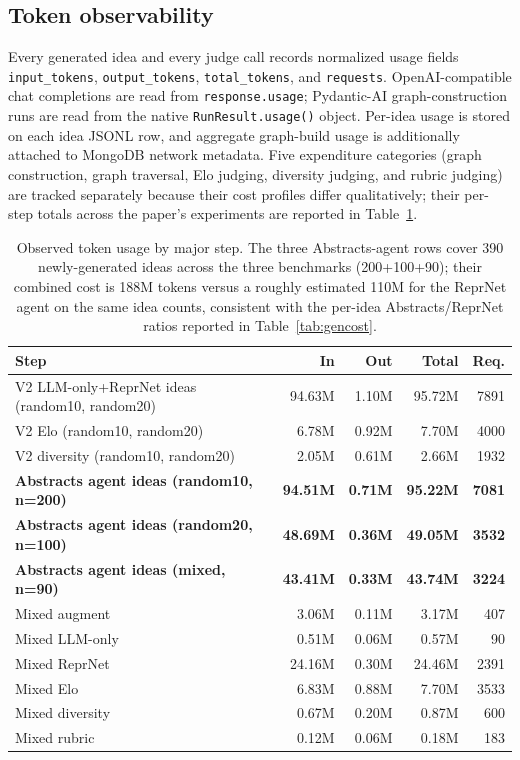 \documentclass[10pt,twocolumn]{article}
\begin{document}
\subsection{Token observability}

Every generated idea and every judge call records normalized usage
fields \texttt{input\_tokens}, \texttt{output\_tokens},
\texttt{total\_tokens}, and \texttt{requests}.  OpenAI-compatible chat
completions are read from \texttt{response.usage}; Pydantic-AI
graph-construction runs are read from the native
\texttt{RunResult.usage()} object.  Per-idea usage is stored on each
idea JSONL row, and aggregate graph-build usage is additionally
attached to MongoDB network metadata.  Five expenditure categories
(graph construction, graph traversal, Elo judging, diversity judging,
and rubric judging) are tracked separately because their cost profiles
differ qualitatively; their per-step totals across the paper's
experiments are reported in Table~\ref{tab:stepcost}.

\begin{table}[t]
\centering
\scriptsize
\setlength{\tabcolsep}{4pt}
\begin{tabular}{lrrrr}
\toprule
Step & In & Out & Total & Req. \\
\midrule
V2 LLM-only+ReprNet ideas (random10, random20) & 94.63M & 1.10M & 95.72M & 7891 \\
V2 Elo (random10, random20)               &  6.78M & 0.92M &  7.70M & 4000 \\
V2 diversity (random10, random20)         &  2.05M & 0.61M &  2.66M & 1932 \\
\textbf{Abstracts agent ideas (random10, n=200)} & \textbf{94.51M} & \textbf{0.71M} & \textbf{95.22M} & \textbf{7081} \\
\textbf{Abstracts agent ideas (random20, n=100)} & \textbf{48.69M} & \textbf{0.36M} & \textbf{49.05M} & \textbf{3532} \\
\textbf{Abstracts agent ideas (mixed, n=90)}     & \textbf{43.41M} & \textbf{0.33M} & \textbf{43.74M} & \textbf{3224} \\
Mixed augment          &  3.06M & 0.11M &  3.17M &  407 \\
Mixed LLM-only         &  0.51M & 0.06M &  0.57M &   90 \\
Mixed ReprNet          & 24.16M & 0.30M & 24.46M & 2391 \\
Mixed Elo              &  6.83M & 0.88M &  7.70M & 3533 \\
Mixed diversity        &  0.67M & 0.20M &  0.87M &  600 \\
Mixed rubric           &  0.12M & 0.06M &  0.18M &  183 \\
\bottomrule
\end{tabular}
\caption{Observed token usage by major step.  The three Abstracts-agent
rows cover 390 newly-generated ideas across the three benchmarks
(200+100+90); their combined cost is 188M tokens versus a roughly
estimated 110M for the ReprNet agent on the same idea counts, consistent
with the per-idea Abstracts/ReprNet ratios reported in
Table~\ref{tab:gencost}.}
\label{tab:stepcost}
\end{table}
\end{document}
